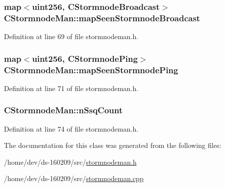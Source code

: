 \subsubsection[{map\+Seen\+Stormnode\+Broadcast}]{\setlength{\rightskip}{0pt plus 5cm}map$<${\bf uint256}, {\bf C\+Stormnode\+Broadcast}$>$ C\+Stormnode\+Man\+::map\+Seen\+Stormnode\+Broadcast}\label{class_c_stormnode_man_a320b85dcbbc8f01a412c96b23bca5424}


Definition at line 69 of file stormnodeman.\+h.

\hypertarget{class_c_stormnode_man_a9d4e8bbd492630f16b61eec58b722a86}{}
\subsubsection[{map\+Seen\+Stormnode\+Ping}]{\setlength{\rightskip}{0pt plus 5cm}map$<${\bf uint256}, {\bf C\+Stormnode\+Ping}$>$ C\+Stormnode\+Man\+::map\+Seen\+Stormnode\+Ping}\label{class_c_stormnode_man_a9d4e8bbd492630f16b61eec58b722a86}


Definition at line 71 of file stormnodeman.\+h.

\hypertarget{class_c_stormnode_man_a28c2a3dcb6098e416de7b1758b8d48da}{}
\subsubsection[{n\+Ssq\+Count}]{ C\+Stormnode\+Man\+::n\+Ssq\+Count}\label{class_c_stormnode_man_a28c2a3dcb6098e416de7b1758b8d48da}


Definition at line 74 of file stormnodeman.\+h.



The documentation for this class was generated from the following files\+:\begin{DoxyCompactItemize}
\item 
/home/dev/ds-\/160209/src/\hyperlink{stormnodeman_8h}{stormnodeman.\+h}\item 
/home/dev/ds-\/160209/src/\hyperlink{stormnodeman_8cpp}{stormnodeman.\+cpp}\end{DoxyCompactItemize}
